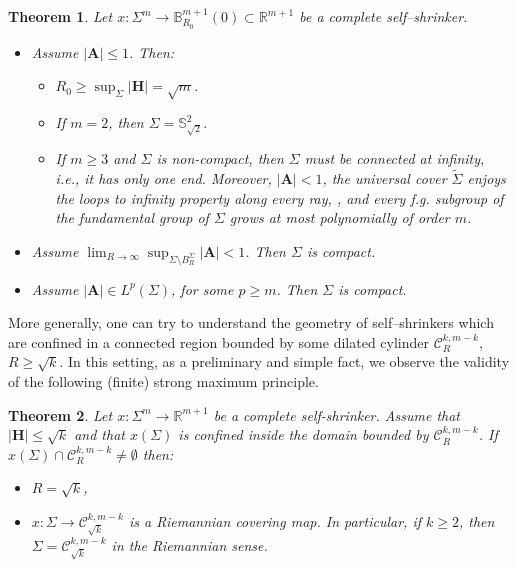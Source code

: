 \documentclass[11pt,leqno]{amsart}\usepackage{amsmath}
\newtheorem{theorem}{Theorem}
\numberwithin{equation}{section}
\begin{document}
\begin{theorem}\label{intro-th_bounded}
Let $x:\Sigma^{m}\rightarrow\mathbb{B}^{m+1}_{R_0}(0) \subset \mathbb{R}^{m+1}$ be a complete self--shrinker.
\begin{itemize}
\item[(a)] Assume $|\mathbf{A}| \leq 1$. Then: \medskip
\begin{itemize}
\item[(a.1)] $R_{0}\geq\sup_{\Sigma}\left\vert \mathbf{H}\right\vert=\sqrt{m}$.
\item[(a.2)] If $m=2$, then $\Sigma=\mathbb{S}^{2}_{\sqrt{2}}$.
\item[(a.3)] If $m\geq 3$ and $\Sigma$ is non-compact, then $\Sigma$ must be connected at infinity, i.e., it has only one end. Moreover, $|\mathbf{A}|<1$, the universal cover $\tilde\Sigma$ enjoys the loops to infinity property along every ray, \cite{So-Indiana}, and every f.g. subgroup of the fundamental group of $\Sigma$ grows at most polynomially of order $m$.
\end{itemize}
\item[(b)]Assume $\lim_{R\to\infty}\sup_{\Sigma\setminus B_R^{\Sigma}}|\mathbf{A}|<1$. Then $\Sigma$ is compact.
\item[(c)] Assume  $|\mathbf{A}| \in L^{p}(\Sigma)$, for some $p\geq m$. Then $\Sigma$ is compact.

\end{itemize}

\end{theorem}

More generally, one can try to understand the geometry of self--shrinkers which are confined in a connected region bounded by some dilated cylinder $\mathcal{C}^{k,m-k}_{R}$, $R\geq \sqrt{k}$. In this setting, as a preliminary and simple fact, we observe the validity of the following (finite) strong maximum principle.

\begin{theorem}
Let $x\colon \Sigma^{m}\rightarrow\mathbb{R}^{m+1}$ be a complete self-shrinker. Assume that
$\left\vert \mathbf{H}\right\vert \leq\sqrt{k}$ and that $x\left(  \Sigma\right)  $ is confined inside the domain
bounded by $\mathcal{C}^{k,m-k}_{R}$.
If $x\left(  \Sigma\right)  \cap \mathcal{C}^{k,m-k}_{R} \neq\emptyset$ then:
\begin{itemize}
\item[(a)] $R=\sqrt{k}$,
\item[(b)] $x:\Sigma \rightarrow\mathcal{C}^{k,m-k}_{\sqrt{k}}$ is a Riemannian covering map. In particular, if
$k\geq2$, then $\Sigma=\mathcal{C}^{k,m-k}_{\sqrt{k}}$ in the Riemannian sense.
\end{itemize}
\end{theorem}
\end{document}
